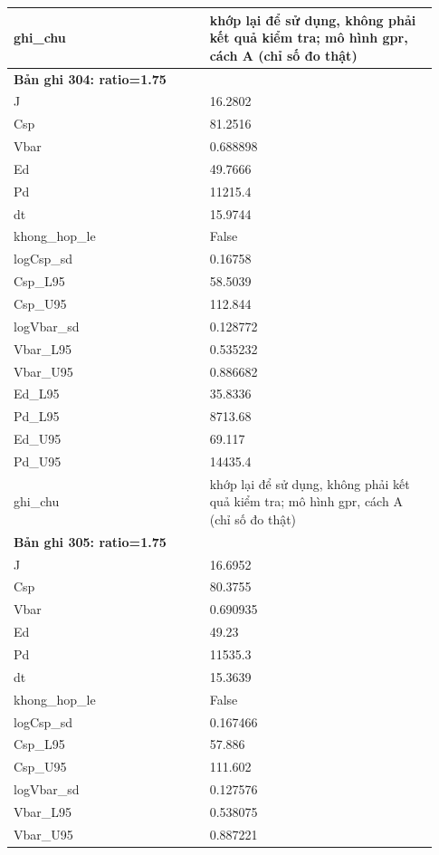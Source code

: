 \begin{longtable}{p{0.43\linewidth}p{0.50\linewidth}}
ghi\_\allowbreak chu & khớp lại để sử dụng, không phải kết quả kiểm tra; mô hình gpr, cách A (chỉ số đo thật) \\
\midrule
\multicolumn{2}{p{0.95\linewidth}}{\textbf{Bản ghi 304: ratio=1.75}} \\
J & 16.2802 \\
Csp & 81.2516 \\
Vbar & 0.688898 \\
Ed & 49.7666 \\
Pd & 11215.4 \\
dt & 15.9744 \\
khong\_\allowbreak hop\_\allowbreak le & False \\
logCsp\_\allowbreak sd & 0.16758 \\
Csp\_\allowbreak L95 & 58.5039 \\
Csp\_\allowbreak U95 & 112.844 \\
logVbar\_\allowbreak sd & 0.128772 \\
Vbar\_\allowbreak L95 & 0.535232 \\
Vbar\_\allowbreak U95 & 0.886682 \\
Ed\_\allowbreak L95 & 35.8336 \\
Pd\_\allowbreak L95 & 8713.68 \\
Ed\_\allowbreak U95 & 69.117 \\
Pd\_\allowbreak U95 & 14435.4 \\
ghi\_\allowbreak chu & khớp lại để sử dụng, không phải kết quả kiểm tra; mô hình gpr, cách A (chỉ số đo thật) \\
\midrule
\multicolumn{2}{p{0.95\linewidth}}{\textbf{Bản ghi 305: ratio=1.75}} \\
J & 16.6952 \\
Csp & 80.3755 \\
Vbar & 0.690935 \\
Ed & 49.23 \\
Pd & 11535.3 \\
dt & 15.3639 \\
khong\_\allowbreak hop\_\allowbreak le & False \\
logCsp\_\allowbreak sd & 0.167466 \\
Csp\_\allowbreak L95 & 57.886 \\
Csp\_\allowbreak U95 & 111.602 \\
logVbar\_\allowbreak sd & 0.127576 \\
Vbar\_\allowbreak L95 & 0.538075 \\
Vbar\_\allowbreak U95 & 0.887221 \\

\end{longtable}
